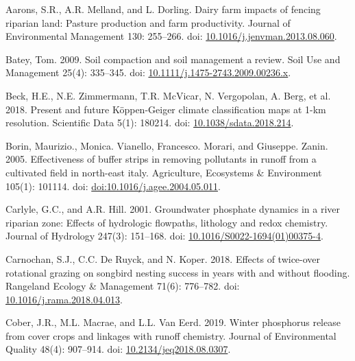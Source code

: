 \documentclass[
]{agujournal2019}
\newlength{\cslhangindent}
\newenvironment{CSLReferences}[2] %
 {\begin{list}{}{%
  \setlength{\itemindent}{0pt}
  \setlength{\leftmargin}{0pt}
  \setlength{\parsep}{0pt}
  \ifodd #1
   \setlength{\leftmargin}{\cslhangindent}
   \setlength{\itemindent}{-1\cslhangindent}
  \fi
  \setlength{\itemsep}{#2\baselineskip}}}
 {\end{list}}
\begin{document}
\label{refs}
\begin{CSLReferences}{1}{1}
\vspace{1em}

Aarons, S.R., A.R. Melland, and L. Dorling. Dairy farm impacts of
fencing riparian land: Pasture production and farm productivity. Journal
of Environmental Management 130: 255--266. doi:
\href{https://doi.org/10.1016/j.jenvman.2013.08.060}{10.1016/j.jenvman.2013.08.060}.

Batey, Tom. 2009. Soil compaction and soil management {\textendash} a
review. Soil Use and Management 25(4): 335--345. doi:
\href{https://doi.org/10.1111/j.1475-2743.2009.00236.x}{10.1111/j.1475-2743.2009.00236.x}.

Beck, H.E., N.E. Zimmermann, T.R. McVicar, N. Vergopolan, A. Berg, et
al. 2018. Present and future Köppen-Geiger climate classification maps
at 1-km resolution. Scientific Data 5(1): 180214. doi:
\href{https://doi.org/10.1038/sdata.2018.214}{10.1038/sdata.2018.214}.

Borin, Maurizio., Monica. Vianello, Francesco. Morari, and Giuseppe.
Zanin. 2005. Effectiveness of buffer strips in removing pollutants in
runoff from a cultivated field in north-east italy. Agriculture,
Ecosystems \& Environment 105(1): 101114. doi:
\href{https://doi.org/doi:10.1016/j.agee.2004.05.011}{doi:10.1016/j.agee.2004.05.011}.

Carlyle, G.C., and A.R. Hill. 2001. Groundwater phosphate dynamics in a
river riparian zone: Effects of hydrologic flowpaths, lithology and
redox chemistry. Journal of Hydrology 247(3): 151--168. doi:
\href{https://doi.org/10.1016/S0022-1694(01)00375-4}{10.1016/S0022-1694(01)00375-4}.

Carnochan, S.J., C.C. De Ruyck, and N. Koper. 2018. Effects of
twice-over rotational grazing on songbird nesting success in years with
and without flooding. Rangeland Ecology \& Management 71(6): 776--782.
doi:
\href{https://doi.org/10.1016/j.rama.2018.04.013}{10.1016/j.rama.2018.04.013}.

Cober, J.R., M.L. Macrae, and L.L. Van Eerd. 2019. Winter phosphorus
release from cover crops and linkages with runoff chemistry. Journal of
Environmental Quality 48(4): 907--914. doi:
\href{https://doi.org/10.2134/jeq2018.08.0307}{10.2134/jeq2018.08.0307}.


\end{CSLReferences}
\end{document}
